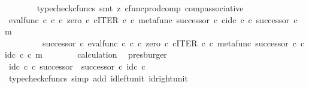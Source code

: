 \begin{isabellebody}
\ \ \ \ \ \ \isamarkupfalse%
\ {\isacharparenleft}{\kern0pt}typecheck{\isacharunderscore}{\kern0pt}cfuncs{\isacharcomma}{\kern0pt}\ smt\ {\isacharparenleft}{\kern0pt}z{}{\isacharparenright}{\kern0pt}\ cfunc{\isacharunderscore}{\kern0pt}prod{\isacharunderscore}{\kern0pt}comp\ comp{\isacharunderscore}{\kern0pt}associative{}{\isacharparenright}{\kern0pt}\isanewline
\ \ \ \ \isamarkupfalse%
\ \isamarkupfalse%
\ {\isachardoublequoteopen}{\isacharparenleft}{\kern0pt}{\isacharparenleft}{\kern0pt}eval{\isacharunderscore}{\kern0pt}func\ {\isasymnat}\isactrlsub c\ {\isasymnat}\isactrlsub c\ {\isasymcirc}\isactrlsub c\ {\isasymlangle}zero\ {\isasymcirc}\isactrlsub c\ {\isasymbeta}\isactrlbsub {\isasymnat}\isactrlsub c\isactrlesub {\isacharcomma}{\kern0pt}ITER\ {\isasymnat}\isactrlsub c\ {\isasymcirc}\isactrlsub c\ {\isasymlangle}metafunc\ successor\ {\isasymcirc}\isactrlsub c\ {\isasymbeta}\isactrlbsub {\isasymnat}\isactrlsub c\isactrlesub {\isacharcomma}{\kern0pt}id\isactrlsub c\ {\isasymnat}\isactrlsub c{\isasymrangle}{\isasymrangle}{\isacharparenright}{\kern0pt}\ {\isasymcirc}\isactrlsub c\ successor{\isacharparenright}{\kern0pt}\ {\isasymcirc}\isactrlsub c\ m\ {\isacharequal}{\kern0pt}\isanewline
\ \ \ \ \ \ \ \ \ {\isacharparenleft}{\kern0pt}successor\ {\isasymcirc}\isactrlsub c\ eval{\isacharunderscore}{\kern0pt}func\ {\isasymnat}\isactrlsub c\ {\isasymnat}\isactrlsub c\ {\isasymcirc}\isactrlsub c\ {\isasymlangle}zero\ {\isasymcirc}\isactrlsub c\ {\isasymbeta}\isactrlbsub {\isasymnat}\isactrlsub c\isactrlesub {\isacharcomma}{\kern0pt}ITER\ {\isasymnat}\isactrlsub c\ {\isasymcirc}\isactrlsub c\ {\isasymlangle}metafunc\ successor\ {\isasymcirc}\isactrlsub c\ {\isasymbeta}\isactrlbsub {\isasymnat}\isactrlsub c\isactrlesub {\isacharcomma}{\kern0pt}id\isactrlsub c\ {\isasymnat}\isactrlsub c{\isasymrangle}{\isasymrangle}{\isacharparenright}{\kern0pt}\ {\isasymcirc}\isactrlsub c\ m{\isachardoublequoteclose}\isanewline
\ \ \ \ \ \ \isamarkupfalse%
\ calculation\ \isamarkupfalse%
\ presburger\isanewline
\ \ \isamarkupfalse%
\isanewline
\ \ \isamarkupfalse%
\ {\isachardoublequoteopen}id\isactrlsub c\ {\isasymnat}\isactrlsub c\ {\isasymcirc}\isactrlsub c\ successor\ {\isacharequal}{\kern0pt}\ successor\ {\isasymcirc}\isactrlsub c\ id\isactrlsub c\ {\isasymnat}\isactrlsub c{\isachardoublequoteclose}\isanewline
\ \ \ \ \isamarkupfalse%
\ {\isacharparenleft}{\kern0pt}typecheck{\isacharunderscore}{\kern0pt}cfuncs{\isacharcomma}{\kern0pt}\ simp\ add{\isacharcolon}{\kern0pt}\ id{\isacharunderscore}{\kern0pt}left{\isacharunderscore}{\kern0pt}unit{}\ id{\isacharunderscore}{\kern0pt}right{\isacharunderscore}{\kern0pt}unit{}{\isacharparenright}{\kern0pt}\isanewline

\end{isabellebody}

